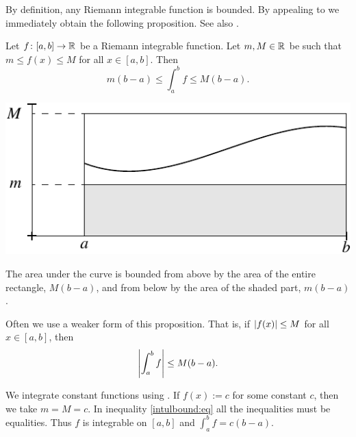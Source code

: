 By definition, any Riemann integrable function is bounded.
By appealing to  we immediately obtain
the following proposition.  See also .

\begin{prop} \label{intbound:prop}
Let $f \colon [a,b] \to {\mathbb{R}}$ be a Riemann integrable function.
Let $m, M \in {\mathbb{R}}$ be 
such that $m \leq f(x) \leq M$ for all $x \in [a,b]$.  Then
\begin{equation*}
m(b-a) \leq
\int_a^b f
\leq M(b-a) .
\end{equation*}
\end{prop}
\begin{myfigureht}
\includegraphics{figures/integralminmax}
\caption{The area under the curve is bounded from above by
the area of the entire rectangle, $M(b-a)$, and from below by
the area of the shaded part, $m(b-a)$.\label{fig:integralminmax}}
\end{myfigureht}

Often we use a weaker form of this proposition.  That is, if
$\left\lvert {f(x)} \right\rvert \leq M$ for all $x \in [a,b]$, then
\begin{equation*}
\left\lvert {\int_a^b f} \right\rvert \leq M(b-a) .
\end{equation*}

\begin{example}
We integrate constant functions using
.
If $f(x) := c$ for some constant $c$, then we take $m = M = c$.
In inequality \eqref{intulbound:eq}
all the inequalities must be equalities.
Thus $f$ is integrable on $[a,b]$ and $\int_a^b f = c(b-a)$.
\end{example}

